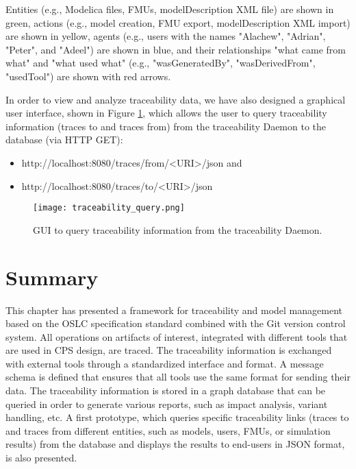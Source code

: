 Entities (e.g., Modelica files, FMUs, modelDescription XML file) are shown in green,
actions (e.g., model creation, FMU export, modelDescription XML import) are shown in yellow,
agents (e.g., users with the names {"Alachew"}, {"Adrian"}, {"Peter"}, and {"Adeel")} are shown in blue,
and their relationships "what came from what" and "what used what" (e.g., "wasGeneratedBy", "wasDerivedFrom", "usedTool") are 
shown with red arrows.

In order to view and analyze traceability data, we have also designed a graphical user interface, shown in
Figure \ref{fig:traceabilityquery}, which allows the user to query traceability information (traces to and traces from) from the traceability
Daemon to the database (via HTTP GET):

\begin{itemize}
\item http://localhost:8080/traces/from/<URI>/json and
\item http://localhost:8080/traces/to/<URI>/json 

\end{itemize}

\begin{figure}
	\texttt{[image: traceability\_query.png]}
	\caption{GUI to query traceability information from the traceability Daemon.}
	\label{fig:traceabilityquery}
\end{figure}
 
\section{Summary}
\label{sec:traceabilitysummary}

This chapter has presented a framework for traceability and model management based on the OSLC specification standard combined with the Git version control system. All operations on artifacts of interest, integrated with different tools that are used in CPS design, are traced. The traceability information is exchanged with external tools through a standardized interface and format. A message schema is defined that ensures that all tools use the same format for sending their data. The traceability information is stored in a graph database that can be queried in order to generate various reports, such as impact analysis, variant handling, etc. A first prototype, which queries specific traceability links (traces to and traces from different entities, such as models, users, FMUs, or simulation results) from the database and displays the results to end-users in JSON format, is also presented. 

